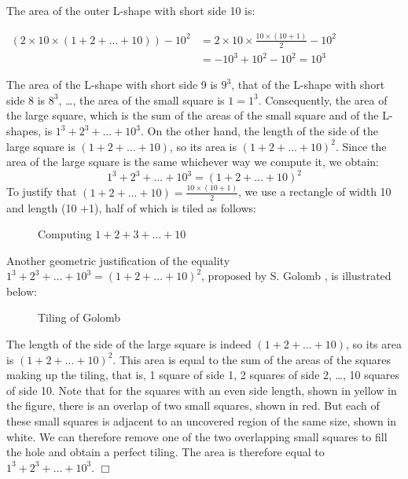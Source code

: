 \begin{corrige}
{\noindent The area of the outer L-shape with short side 10 is:
\begin{center}
$\begin{array}{ll}
(2 \times 10 \times (1 + 2 + \ldots + 10))  - 10^{2} & = 2 \times 10 \times \frac{10 \times (10 +1)}{2} - 10^{2}\\
& = -10^{3} + 10^{2} - 10^{2} = 10^{3}
\end{array}$
\end{center}
The area of the L-shape with short side 9 is $9^{3}$, that of the L-shape with short side 8 is $8^{3}$,  \ldots,
the area of the small square is $1 = 1^{3}$.
Consequently, the area of the large square, which
is the sum of the areas of the small square and of the L-shapes, is $1^{3} + 2^{3} + \ldots + 10^{3}$.
On the other hand, the length of the side of the large square is $(1 + 2 + \ldots + 10)$, so its area is
$(1 + 2 + \ldots + 10)^{2}$. Since the area of the large square is the same whichever way
we compute it, we obtain:
\[ 1^{3} + 2^{3} + \ldots + 10^{3} = (1 + 2 + \ldots + 10)^{2}\]
To justify that $(1 + 2 + \ldots + 10) = \frac{10 \times (10 +1)}{2}$, we use a rectangle of
width 10 and length (10 +1), half of which is tiled as follows:

\begin{figure}[htbp]
 \caption{Computing $1 + 2 + 3 + \ldots + 10$}
\end{figure}

Another geometric justification of the equality
$1^{3} + 2^{3} + \ldots + 10^{3} = (1 + 2 + \ldots + 10)^{2}$, proposed by S. Go\-lomb
\cite{golomb1}, is illustrated below:

\begin{figure}[htbp]
 \caption{Tiling of Golomb}
 \label{fig:golomb}
\end{figure}

\noindent The length of the side of the large square is indeed $(1 + 2 + \ldots + 10)$, so its area is
$(1 + 2 + \ldots + 10)^{2}$. This area is equal to the sum of the areas of the squares
making up the tiling, that is, 1 square of side 1, 2 squares of side 2, \ldots, 10
squares of side 10. Note
that for the squares with an even side length, shown in yellow in the figure,
there is an
overlap of two small squares, shown in red. But each of these small squares
is adjacent to an uncovered region of the same size, shown in white. We can therefore
remove one of the two overlapping small squares to fill the hole and obtain a perfect tiling.
 The area is therefore equal to $1^{3} + 2^{3} + \ldots + 10^{3}$.
\noindent $\Box$}\end{corrige}


